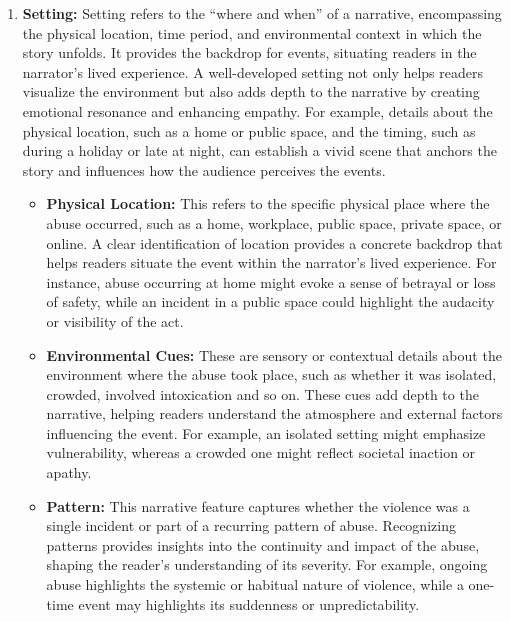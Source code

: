 \documentclass[11pt]{article}
\begin{document}
\begin{enumerate}
    \item \textbf{Setting: } 
    Setting refers to the ``where and when'' of a narrative, encompassing the physical location, time period, and environmental context in which the story unfolds. It provides the backdrop for events, situating readers in the narrator's lived experience. A well-developed setting not only helps readers visualize the environment but also adds depth to the narrative by creating emotional resonance and enhancing empathy. For example, details about the physical location, such as a home or public space, and the timing, such as during a holiday or late at night, can establish a vivid scene that anchors the story and influences how the audience perceives the events.
    \begin{itemize}
        \item \textbf{Physical Location:} This refers to the specific physical place where the abuse occurred, such as a home, workplace, public space, private space, or online. 
        A clear identification of location provides a concrete backdrop that helps readers situate the event within the narrator's lived experience. 
        For instance, abuse occurring at home might evoke a sense of betrayal or loss of safety, while an incident in a public space could highlight the audacity or visibility of the act.
        \item \textbf{Environmental Cues:} These are sensory or contextual details about the environment where the abuse took place, such as whether it was isolated, crowded, involved intoxication and so on. 
        These cues add depth to the narrative, helping readers understand the atmosphere and external factors influencing the event. 
        For example, an isolated setting might emphasize vulnerability, whereas a crowded one might reflect societal inaction or apathy.
        \item \textbf{Pattern:} This narrative feature captures whether the violence was a single incident or part of a recurring pattern of abuse. 
        Recognizing patterns provides insights into the continuity and impact of the abuse, shaping the reader’s understanding of its severity. 
        For example, ongoing abuse highlights the systemic or habitual nature of violence, while a one-time event may highlights its suddenness or unpredictability.
    \end{itemize}


\end{enumerate}
\end{document}

